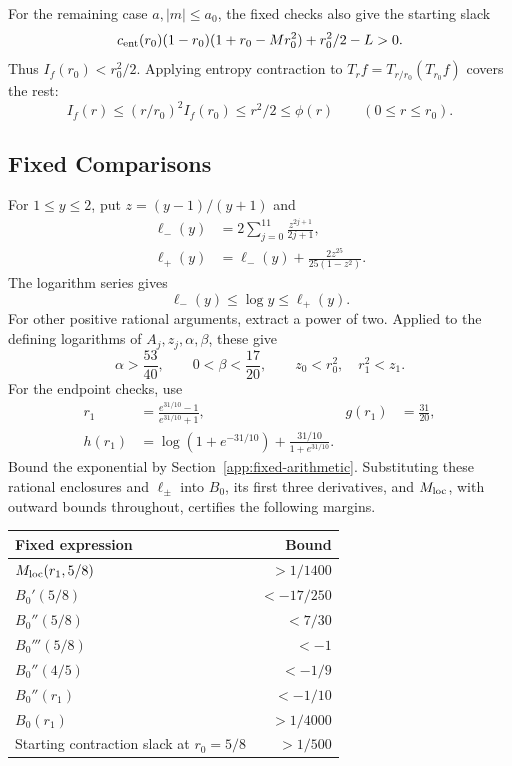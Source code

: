 For the remaining case \(a,|m|\le a_0\), the fixed checks also give
the starting slack
\[
 c_{\rm ent}(r_0)(1-r_0)(1+r_0-Mr_0^2)+r_0^2/2-L>0.
\]
Thus \(I_f(r_0)<r_0^2/2\). Applying entropy contraction to
\(T_r f=T_{r/r_0}(T_{r_0}f)\) covers the rest:
\[
 I_f(r)\le(r/r_0)^2I_f(r_0)\le r^2/2\le\phi(r)
                   \qquad(0\le r\le r_0).
\]

\subsection{Fixed Comparisons}
\label{app:low-arithmetic}

For \(1\le y\le2\), put \(z=(y-1)/(y+1)\) and
\begin{align*}
 \ell_-(y)&=2\sum_{j=0}^{11}\frac{z^{2j+1}}{2j+1},\\
 \ell_+(y)&=\ell_-(y)+\frac{2z^{25}}{25(1-z^2)}.
\end{align*}
The logarithm series gives
\[
 \ell_-(y)\le\log y\le\ell_+(y).
\]
For other positive rational arguments, extract a power of two.
Applied to the defining logarithms of \(A_j,z_j,\alpha,\beta\), these give
\[
 \alpha>\frac{53}{40},\qquad 0<\beta<\frac{17}{20},\qquad
 z_0<r_0^2,\quad r_1^2<z_1.
\]
For the endpoint checks, use
\begin{align*}
 r_1&=\frac{e^{31/10}-1}{e^{31/10}+1},&
 g(r_1)&=\frac{31}{20},\\
 h(r_1)&=\log(1+e^{-31/10})+\frac{31/10}{1+e^{31/10}}.
\end{align*}
Bound the exponential by Section~\ref{app:fixed-arithmetic}.
Substituting these rational enclosures and \(\ell_\pm\) into
\(B_0\), its first three derivatives, and \(M_{\rm loc}\), with
outward bounds throughout, certifies the following margins.
\begin{center}\small
\begin{tabular}{@{}p{.71\linewidth}r@{}}
\toprule
Fixed expression & Bound\\ \midrule
\(M_{\rm loc}(r_1,5/8)\) & \(>1/1400\)\\
\(B_0'(5/8)\) & \(<-17/250\)\\
\(B_0''(5/8)\) & \(<7/30\)\\
\(B_0'''(5/8)\) & \(<-1\)\\
\(B_0''(4/5)\) & \(<-1/9\)\\
\(B_0''(r_1)\) & \(<-1/10\)\\
\(B_0(r_1)\) & \(>1/4000\)\\
Starting contraction slack at \(r_0=5/8\) & \(>1/500\)\\
\bottomrule
\end{tabular}
\end{center}
